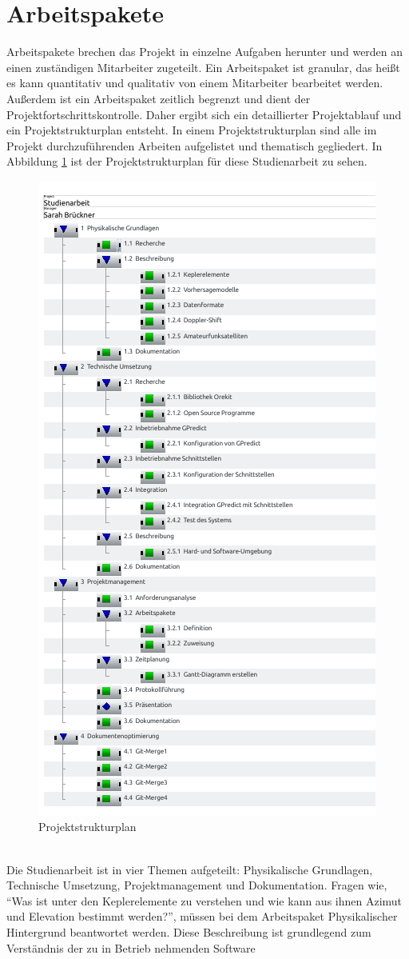 \section{Arbeitspakete}
Arbeitspakete brechen das Projekt in einzelne Aufgaben herunter und werden an einen 
zuständigen Mitarbeiter zugeteilt. Ein Arbeitspaket ist granular, das heißt es kann quantitativ und 
qualitativ von einem Mitarbeiter bearbeitet werden. Außerdem ist ein Arbeitspaket zeitlich begrenzt 
und dient der Projektfortschrittskontrolle. 
Daher ergibt sich ein detaillierter Projektablauf und ein Projektstrukturplan entsteht. In einem 
Projektstrukturplan sind alle im Projekt durchzuführenden Arbeiten aufgelistet und thematisch 
gegliedert. In Abbildung \ref{fig:projektstruktur} ist der Projektstrukturplan für diese Studienarbeit zu sehen.
\begin{figure}[h]
 \centering
\includegraphics[width=0.5\linewidth]{./images/00tasks}
\caption{Projektstrukturplan}
 \label{fig:projektstruktur}
\end{figure}
\\
Die Studienarbeit ist in vier Themen aufgeteilt: Physikalische Grundlagen, Technische Umsetzung, 
Projektmanagement und Dokumentation. Fragen wie, ``Was ist unter den Keplerelemente zu 
verstehen und wie kann aus ihnen Azimut und Elevation bestimmt werden?'', müssen bei dem Arbeitspaket Physikalischer Hintergrund  beantwortet 
werden. Diese Beschreibung ist grundlegend zum Verständnis der zu in Betrieb nehmenden Software 
